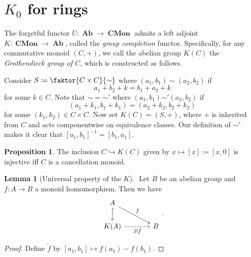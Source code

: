 \documentclass[10pt,letterpaper,cm]{nupset}
\theoremstyle{definition}
\theoremstyle{theorem}
\newtheorem{lemma}[definition]{Lemma}
\newtheorem{prop}[definition]{Proposition}
\theoremstyle{remark}
\newcommand{\1}{\mathbf{1}}
\newcommand{\0}{\vec 0}
\DeclareMathOperator{\Ab}{\mathbf{Ab}}
\DeclareMathOperator{\Cmon}{\mathbf{CMon}}
\begin{document}
\begin{abstract}
We begin low-dimensional $K$-theory, which consists of the groups $K_0(-)$, $K_1(-)$, and $K_2(-)$. Specifically, we describe $K_0$ for rings and for topological spaces. The main sources for this talk are the following.
\begin{itemize}
\item $n$Lab.
\item Charles Weibel's \textit{The $K$-book: an introduction to algebraic $K$-theory}, Chapters I and II.
\item Eric M. Friedlander's \textit{An Introduction to $K$-theory}, Chapter 1.
\end{itemize}
\end{abstract}

\smallskip

\section{$K_0$ for rings}

The forgetful functor $U: \Ab \to \Cmon$ admits a left adjoint $K: \Cmon \to \Ab$, called the \textit{group completion} functor. Specifically, for any commutative monoid $\left(C, +\right)$, we call the abelian group $K(C)$ the \textit{Grothendieck group of $C$}, which is constructed as follows.

\medskip

 Consider $S\coloneqq \faktor{C \times C}{\sim}$ where $(a_1, b_1) \sim (a_2, b_2)$ if $$a_1 + b_2 +k = b_1 + a_2 +k$$ for some $k\in C$. Note that $\sim = {\sim'}$ where $(a_1, b_1) {\sim'} (a_2, b_2)$ if $$\left(a_1 + k_1, b_1 + k_1\right) = \left(a_2 +k_2, b_2 + k_2\right)$$ for some $\left(k_1, k_2\right) \in C\times C$. Now set $K(C) = \left(S, +\right)$, where $+$ is inherited from $C$ and acts componentwise on equivalence classes. Our definition of ${\sim'}$ makes it clear that $\left[a_1, b_1\right]^{{-1}} = \left[b_1, a_1\right]$.

\begin{prop}
The inclusion $C \hookrightarrow K(C)$ given by $x \mapsto [x]\coloneqq \left[x, 0\right]$ is injective iff $C$ is a cancellation monoid.
\end{prop}

\begin{lemma}[Universal property of the $K$] $ $
Let $B$ be an abelian group and $f: A \to B$ a monoid homomorphism. Then we have 
\[
\begin{tikzcd}[column sep=large]
A \arrow[rd, "f"] \arrow[d, hook] &  \\
K(A) \arrow[swap, r, "\exists! \tilde{f}", dashed] & B
\end{tikzcd}.
\]
\end{lemma}
\begin{proof}
Define $\tilde{f}$ by $[a_1, b_1]\mapsto f(a_1) - f(b_1)$.
\end{proof}
\end{document}
